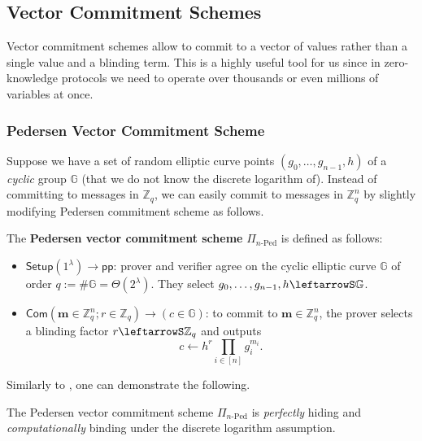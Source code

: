 \documentclass[../../book]{subfiles}
\begin{document}
\subsection{Vector Commitment Schemes}

Vector commitment schemes allow to commit to a vector of values rather than a single value and a blinding term.
This is a highly useful tool for us since in zero-knowledge protocols we need to operate over thousands or even millions of variables at once.

\subsubsection{Pedersen Vector Commitment Scheme}

Suppose we have a set of random elliptic curve points $(g_0, \ldots, g_{n-1}, h)$ of a \emph{cyclic} group $\mathbb{G}$ (that we do not know the discrete logarithm of).
Instead of committing to messages in $\mathbb{Z}_q$, we can easily commit to messages in $\mathbb{Z}_q^n$ by slightly modifying Pedersen commitment scheme as follows.

\begin{definition}
    The \textbf{Pedersen vector commitment scheme} $\Pi_{n\text{-Ped}}$ is defined as follows:
    \begin{itemize}
        \item $\mathsf{Setup}(1^{\lambda}) \to \mathsf{pp}$: prover and verifier agree on the cyclic elliptic curve $\mathbb{G}$ of order $q:=\#\mathbb{G}=\Theta(2^{\lambda})$.
        They select $g_0,\dots,g_{n-1},h \leftarrowS \mathbb{G}$.
        \item $\mathsf{Com}(\mathbf{m} \in \mathbb{Z}_q^n; r \in \mathbb{Z}_q) \to (c \in \mathbb{G})$: to commit to $\mathbf{m} \in \mathbb{Z}_q^n$, the prover selects a blinding factor $r \leftarrowS \mathbb{Z}_q$ and outputs
        \begin{equation*}
            c \gets h^r\prod_{i \in [n]} g_i^{m_i}.
        \end{equation*}
    \end{itemize}
\end{definition}

Similarly to , one can demonstrate the following.

\begin{lemma}
    The Pedersen vector commitment scheme $\Pi_{n\text{-Ped}}$ is \emph{perfectly} hiding and \emph{computationally} binding under the discrete logarithm assumption.
\end{lemma}
\end{document}

